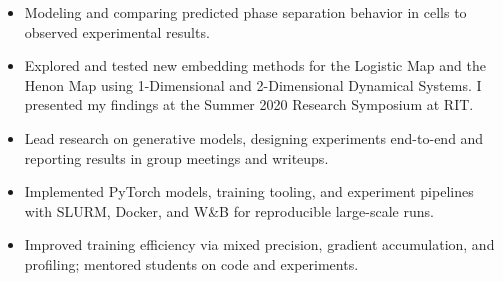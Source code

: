 \documentclass[10pt,a4paper]{altacv}
\begin{document}
\begin{itemize}
    \item Modeling and comparing predicted phase separation behavior in cells to observed experimental results. 
\end{itemize}

\begin{itemize}
    \item Explored and tested new embedding methods for the Logistic Map and the Henon Map using 1-Dimensional and 2-Dimensional Dynamical Systems. I presented my findings at the Summer 2020 Research Symposium at RIT.
\end{itemize}





\begin{itemize}
    \item Lead research on generative models, designing experiments end-to-end and reporting results in group meetings and writeups.
    \item Implemented PyTorch models, training tooling, and experiment pipelines with SLURM, Docker, and W\&B for reproducible large-scale runs.
    \item Improved training efficiency via mixed precision, gradient accumulation, and profiling; mentored students on code and experiments.
\end{itemize}
\end{document}

